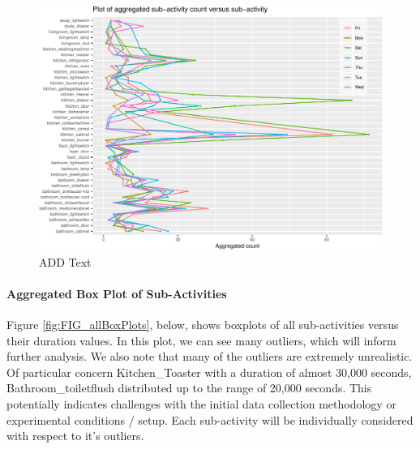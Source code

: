 \documentclass[11pt,]{article}
\let\oldparagraph\paragraph
\renewcommand{\paragraph}[1]{\oldparagraph{#1}\mbox{}}
\begin{document}
\begin{figure}[H]

{\centering \includegraphics{MD_Final_files/figure-latex/FIG_aggLineChart-1} 

}

\caption{ADD Text}\label{fig:FIG_aggLineChart}
\end{figure}

\pagebreak

\hypertarget{aggregated-box-plot-of-sub-activities}{%
\paragraph{Aggregated Box Plot of
Sub-Activities}\label{aggregated-box-plot-of-sub-activities}}

Figure \ref{fig:FIG_allBoxPlots}, below, shows boxplots of all
sub-activities versus their duration values. In this plot, we can see
many outliers, which will inform further analysis. We also note that
many of the outliers are extremely unrealistic. Of particular concern
Kitchen\_Toaster with a duration of almost 30,000 seconds,
Bathroom\_toiletflush distributed up to the range of 20,000 seconds.
This potentially indicates challenges with the initial data collection
methodology or experimental conditions / setup. Each sub-activity will
be individually considered with respect to it's outliers.
\end{document}
